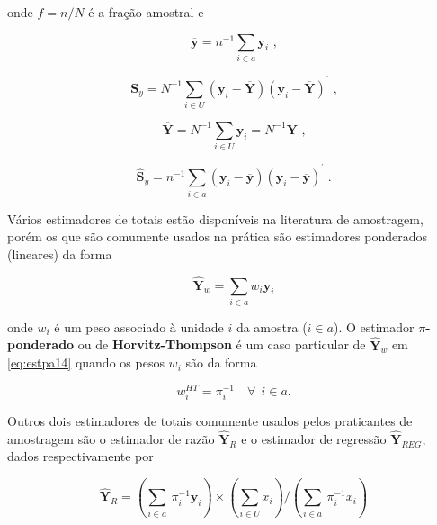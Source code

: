 \documentclass[]{book}
\theoremstyle{definition}
\theoremstyle{definition}
\theoremstyle{definition}
\theoremstyle{remark}
\begin{document}
onde \(f=n/N\) é a fração amostral e

\begin{equation}
\overline{\mathbf{y}} = n^{-1} \sum_{i \in a} \mathbf{y}_i \mbox{ ,} \label{eq:estpa10}
\end{equation}

\begin{equation}
\mathbf{S}_y = N^{-1} \sum_{i \in U} \left( \mathbf{y}_i - \overline{\mathbf{Y}}
\right) \left( \mathbf{y}_i - \overline{\mathbf{Y}} \right) ^{^{\prime }} \mbox{ ,}  \label{eq:estpa11}
\end{equation}

\begin{equation}
\overline{\mathbf{Y}} = N^{-1} \sum_{i \in U} \mathbf{y}_i = N^{-1} \mathbf{Y} \mbox{ ,}  \label{eq:estpa12}
\end{equation}

\begin{equation}
\widehat{\mathbf{S}}_y = n^{-1} \sum_{i \in a} \left( \mathbf{y}_i - \overline{\mathbf{y}} \right) \left( \mathbf{y}_i - \overline{\mathbf{y}} \right) ^{^{\prime }} \;. \label{eq:estpa13} 
\end{equation}

Vários estimadores de totais estão disponíveis na literatura de
amostragem, porém os que são comumente usados na prática são estimadores
ponderados (lineares) da forma

\begin{equation}
\mathbf{\hat{Y}}_w = \sum\limits_{i \in a} w_i \mathbf{y}_i  \label{eq:estpa14}
\end{equation}

onde \(w_i\) é um peso associado à unidade \(i\) da amostra
(\(i \in a\)). O estimador \(\pi\)\textbf{-ponderado} ou de
\textbf{Horvitz-Thompson} é um caso particular de \(\mathbf{\hat{Y}}_w\)
em \eqref{eq:estpa14} quando os pesos \(w_i\) são da forma

\[
w_i^{HT} = \pi_i ^{-1} \quad \forall \ \ i \in a. 
\]

Outros dois estimadores de totais comumente usados pelos praticantes de
amostragem são o estimador de razão \(\mathbf{\hat{Y}}_R\) e o estimador
de regressão \(\mathbf{\hat{Y}}_{REG}\), dados respectivamente por

\begin{equation}
\mathbf{\hat{Y}}_R = \left( \sum_{i \in a} {\ \pi_i^{-1}} \mathbf{y}_i \right) \times \left( \sum_{i \in U}x_i \right) / \left( \sum_{i \in a} {\ \pi_i^{-1}} x_i \right)  \label{eq:estpa15}
\end{equation}
\end{document}
